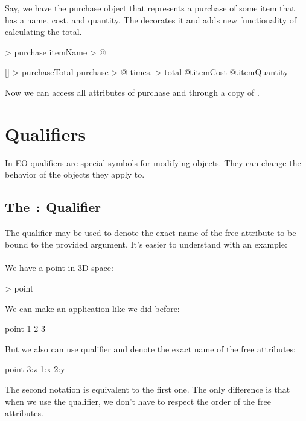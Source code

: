 \documentclass[12pt]{book}
\begin{document}
Say, we have the purchase object that represents a purchase of some item that has a name, cost, and quantity. The  decorates it and adds new functionality of calculating the total.

\begin{ffcode}
 > purchase
  itemName > @

[] > purchaseTotal
  purchase > @
  times. > total
    @.itemCost
    @.itemQuantity
\end{ffcode}

Now we can access all attributes of purchase and  through a copy of .

\section{Qualifiers}
In EO qualifiers are special symbols for modifying objects. They can change the behavior of the objects they apply to.

\subsection{The \texttt{:} Qualifier} \label{subsec:":"-qualifier}
The \ff{:} qualifier may be used to denote the exact name of the free attribute to be bound to the provided argument. It's easier to understand with an example:
\\
\\
We have a point in 3D space:
\begin{ffcode}
[x y z] > point
\end{ffcode}
We can make an application like we did before:
\begin{ffcode}
point
  1
  2
  3
\end{ffcode}
But we also can use \ff{:} qualifier and denote the exact name of the free attributes:
\begin{ffcode}
point
  3:z
  1:x
  2:y
\end{ffcode}
The second notation is equivalent to the first one. The only difference is that when we use the \ff{:} qualifier, we don't have to respect the order of the free attributes.
\end{document}
